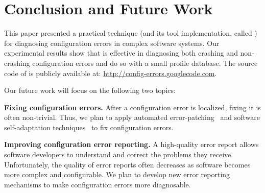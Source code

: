\section{Conclusion and Future Work}
\vspace{-1mm}

This paper presented a practical technique (and
its tool implementation, called \ourtool) for diagnosing
configuration errors in complex software systems.
Our experimental results show that \ourtool is effective in
diagnosing both crashing and non-crashing configuration errors
and do so with a small profile database.
The source code of \ourtool is publicly available at:
\url{http://config-errors.googlecode.com}.

\vspace{1mm}

Our future
work will focus on the following two topics:


\textbf{Fixing configuration errors.} After a configuration error
is localized, fixing it is
often non-trivial. Thus, we
plan to apply automated error-patching~\cite{rangefix} and
software self-adaptation techniques~\cite{Wang:2009:STR} to
fix configuration errors.


\textbf{Improving configuration error reporting.} A high-quality
error report allows software developers to understand and correct the problems
they receive. 
Unfortunately, the quality of error reports often
decreases as software becomes more complex and configurable.
We plan to develop new error reporting mechanisms
to make configuration errors
more diagnosable.

